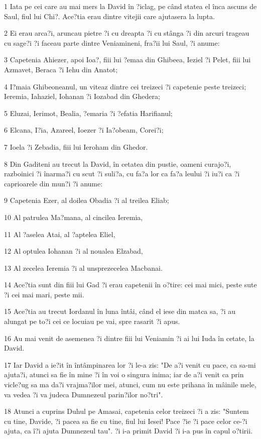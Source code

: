 \par 1 Iata pe cei care au mai mers la David în ?iclag, pe când statea el înca ascuns de Saul, fiul lui Chi?. Ace?tia erau dintre vitejii care ajutasera la lupta.
\par 2 Ei erau arca?i, aruncau pietre ?i cu dreapta ?i cu stânga ?i din arcuri trageau cu sage?i ?i faceau parte dintre Veniamineni, fra?ii lui Saul, ?i anume:
\par 3 Capetenia Ahiezer, apoi Ioa?, fiii lui ?emaa din Ghibeea, Ieziel ?i Pelet, fiii lui Azmavet, Beraca ?i Iehu din Anatot;
\par 4 I?maia Ghibeoneanul, un viteaz dintre cei treizeci ?i capetenie peste treizeci; Ieremia, Iahaziel, Iohanan ?i Iozabad din Ghedera;
\par 5 Eluzai, Ierimot, Bealia, ?emaria ?i ?efatia Harifianul;
\par 6 Elcana, I?ia, Azareel, Ioezer ?i Ia?obeam, Corei?i;
\par 7 Ioela ?i Zebadia, fiii lui Ieroham din Ghedor.
\par 8 Din Gaditeni au trecut la David, în cetatea din pustie, oameni curajo?i, razboinici ?i înarma?i cu scut ?i suli?a, cu fa?a lor ca fa?a leului ?i iu?i ca ?i caprioarele din mun?i ?i anume:
\par 9 Capetenia Ezer, al doilea Obadia ?i al treilea Eliab;
\par 10 Al patrulea Ma?mana, al cincilea Ieremia,
\par 11 Al ?aselea Atai, al ?aptelea Eliel,
\par 12 Al optulea Iohanan ?i al noualea Elzabad,
\par 13 Al zecelea Ieremia ?i al unsprezecelea Macbanai.
\par 14 Ace?tia sunt din fiii lui Gad ?i erau capetenii în o?tire: cei mai mici, peste sute ?i cei mai mari, peste mii.
\par 15 Ace?tia au trecut Iordanul în luna întâi, când el iese din matca sa, ?i au alungat pe to?i cei ce locuiau pe vai, spre rasarit ?i apus.
\par 16 Au mai venit de asemenea ?i dintre fiii lui Veniamin ?i ai lui Iuda în cetate, la David.
\par 17 Iar David a ie?it în întâmpinarea lor ?i le-a zis: "De a?i venit cu pace, ca sa-mi ajuta?i, atunci sa fie în mine ?i în voi o singura inima; iar de a?i venit ca prin vicle?ug sa ma da?i vrajma?ilor mei, atunci, cum nu este prihana în mâinile mele, va vedea ?i va judeca Dumnezeul parin?ilor no?tri".
\par 18 Atunci a cuprins Duhul pe Amasai, capetenia celor treizeci ?i a zis: "Suntem cu tine, Davide, ?i pacea sa fie cu tine, fiul lui Iesei! Pace ?ie ?i pace celor ce-?i ajuta, ca î?i ajuta Dumnezeul tau". ?i i-a primit David ?i i-a pus în capul o?tirii.
